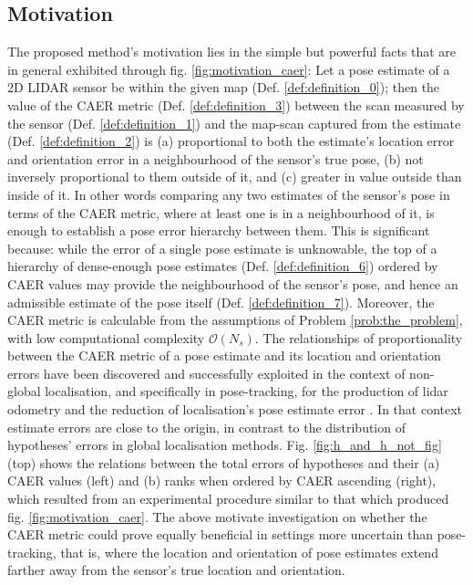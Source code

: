 \subsection{Motivation}
\label{subsec:motivation}

The proposed method's motivation lies in the simple but powerful facts that are
in general exhibited through fig. \ref{fig:motivation_caer}: Let a pose
estimate of a 2D LIDAR sensor be within the given map (Def.
\ref{def:definition_0}); then the value of the CAER metric (Def.
\ref{def:definition_3}) between the scan measured by the sensor (Def.
\ref{def:definition_1}) and the map-scan captured from the estimate (Def.
\ref{def:definition_2}) is (a) proportional to both the estimate's location
error and orientation error in a neighbourhood of the sensor's true pose, (b)
not inversely proportional to them outside of it, and (c) greater in value
outside than inside of it. In other words comparing any two estimates of
the sensor's pose in terms of the CAER metric, where at least one is in a
neighbourhood of it, is enough to establish a pose error hierarchy between
them.  This is significant because: while the error of a single pose estimate
is unknowable, the top of a hierarchy of dense-enough pose estimates (Def.
\ref{def:definition_6}) ordered by CAER values may provide the neighbourhood of
the sensor's pose, and hence an admissible estimate of the pose itself (Def.
\ref{def:definition_7}).  Moreover, the CAER metric is calculable from
the assumptions of Problem \ref{prob:the_problem}, with low computational
complexity $\mathcal{O}(N_s)$.  The relationships of proportionality between
the CAER metric of a pose estimate and its location and orientation errors have
been discovered and successfully exploited in the context of non-global
localisation, and specifically in pose-tracking, for the production of lidar
odometry \cite{Filotheou2022f} and the reduction of localisation's pose
estimate error \cite{Filotheou2023a}. In that context estimate errors are close
to the origin, in contrast to the distribution of hypotheses' errors in global
localisation methods.  Fig. \ref{fig:h_and_h_not_fig} (top) shows the relations
between the total errors of hypotheses and their (a) CAER values (left) and (b)
ranks when ordered by CAER ascending (right), which resulted from an
experimental procedure similar to that which produced fig.
\ref{fig:motivation_caer}. The above motivate investigation on whether the CAER
metric could prove equally beneficial in settings more uncertain than
pose-tracking, that is, where the location and orientation of pose estimates
extend farther away from the sensor's true location and orientation.



